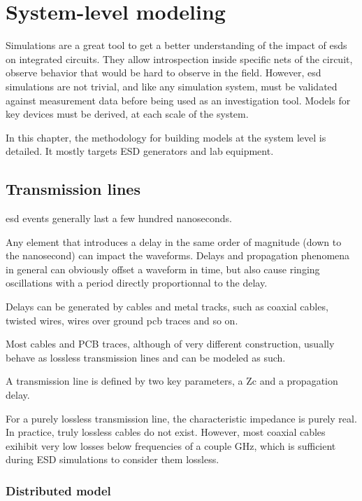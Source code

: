 \section{System-level modeling}

Simulations are a great tool to get a better understanding of the impact of \gls{esd}s on integrated circuits.
They allow introspection inside specific nets of the circuit, observe behavior that would be hard to observe in the field.
However, \gls{esd} simulations are not trivial, and like any simulation system, must be validated against measurement data before being used as an investigation tool.
Models for key devices must be derived, at each scale of the system.

In this chapter, the methodology for building models at the system level is detailed.
It mostly targets ESD generators and lab equipment.

\subsection{Transmission lines}

\gls{esd} events generally last a few hundred nanoseconds.

Any element that introduces a delay in the same order of magnitude (down to the nanosecond) can impact the waveforms.
Delays and propagation phenomena in general can obviously offset a waveform in time,
but also cause ringing oscillations with a period directly proportionnal to the delay.

Delays can be generated by cables and metal tracks, such as coaxial cables, twisted wires, wires over ground \gls{pcb} traces and so on.

Most cables and PCB traces, although of very different construction, usually behave as lossless transmission lines and can be modeled as such.

A transmission line is defined by two key parameters, a \gls{Zc} and a propagation delay.


For a purely lossless transmission line, the characteristic impedance is purely real.
In practice, truly lossless cables do not exist.
However, most coaxial cables exihibit very low losses below frequencies of a couple GHz, which is sufficient during ESD simulations to consider them lossless.

\subsubsection{Distributed model}

